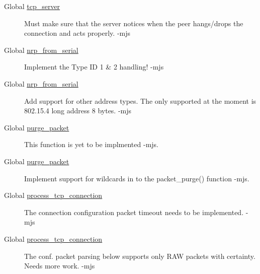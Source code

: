 \label{todo__todo000016}
\hypertarget{todo__todo000016}{}
 \begin{description}
\item[Global \hyperlink{nRouted_8c_670df12c784cbf1b260ab50397194b66}{tcp\_\-server} ]Must make sure that the server notices when the peer hangs/drops the connection and acts properly. -mjs \end{description}


\label{todo__todo000012}
\hypertarget{todo__todo000012}{}
 \begin{description}
\item[Global \hyperlink{serialserver_8c_0a07beae6fb26ce3e0e812b24126dda0}{nrp\_\-from\_\-serial} ]Implement the Type ID 1 \& 2 handling! -mjs \end{description}


\label{todo__todo000012}
\hypertarget{todo__todo000012}{}
 \begin{description}
\item[Global \hyperlink{serialserver_8c_0a07beae6fb26ce3e0e812b24126dda0}{nrp\_\-from\_\-serial} ]Add support for other address types. The only supported at the moment is 802.15.4 long address 8 bytes. -mjs \end{description}


\label{todo__todo000014}
\hypertarget{todo__todo000014}{}
 \begin{description}
\item[Global \hyperlink{serialserver_8c_d1906dfda0437f68ccc02e98ec91b6d9}{purge\_\-packet} ]This function is yet to be implmented -mjs. \end{description}


\label{todo__todo000015}
\hypertarget{todo__todo000015}{}
 \begin{description}
\item[Global \hyperlink{serialserver_8h_d1906dfda0437f68ccc02e98ec91b6d9}{purge\_\-packet} ]Implement support for wildcards in to the packet\_\-purge() function -mjs. \end{description}


\label{todo__todo000017}
\hypertarget{todo__todo000017}{}
 \begin{description}
\item[Global \hyperlink{tcpserver_8c_0eb8fdec50bfdfa77f5dca2e40ba7f99}{process\_\-tcp\_\-connection} ]The connection configuration packet timeout needs to be implemented. -mjs \end{description}


\label{todo__todo000017}
\hypertarget{todo__todo000017}{}
 \begin{description}
\item[Global \hyperlink{tcpserver_8c_0eb8fdec50bfdfa77f5dca2e40ba7f99}{process\_\-tcp\_\-connection} ]The conf. packet parsing below supports only RAW packets with certainty. Needs more work. -mjs \end{description}


